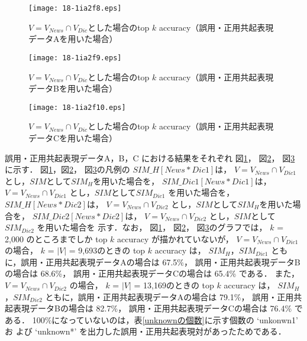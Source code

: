 \documentclass[japanese]{jnlp_1.4}
\begin{document}
\begin{figure}[t]
\begin{center}
\texttt{[image: 18-1ia2f8.eps]}
\end{center}
\caption{$V=V_{News}\cap V_{Dic}$とした場合のtop $k$ accuracy（誤用・正用共起表現データAを用いた場合）}
\label{類似度のみ共通topK-A}
\end{figure}
\begin{figure}[t]
\begin{center}
\texttt{[image: 18-1ia2f9.eps]}
\end{center}
\caption{$V=V_{News}\cap V_{Dic}$とした場合のtop $k$ accuracy（誤用・正用共起表現データBを用いた場合）}
\label{類似度のみ共通topK-B}
\end{figure}

\begin{figure}[t]
\begin{center}
\texttt{[image: 18-1ia2f10.eps]}
\end{center}
\caption{$V=V_{News}\cap V_{Dic}$とした場合のtop $k$ accuracy（誤用・正用共起表現データCを用いた場合）}
\label{類似度のみ共通topK-C}
\end{figure}

誤用・正用共起表現データA，B，C における結果をそれぞれ
図\ref{類似度のみ共通topK-A}，
図\ref{類似度のみ共通topK-B}，
図\ref{類似度のみ共通topK-C}に示す．
図\ref{類似度のみ共通topK-A}，図\ref{類似度のみ共通topK-B}，
図\ref{類似度のみ共通topK-C}の凡例の
$SIM\_H[News*Dic1]$は，
$V = V_{News} \cap V_{Dic1}$ とし，$SIM$として$SIM_{H}$を用いた場合を，
$SIM\_Dic1[News*Dic1]$は，
$V = V_{News} \cap V_{Dic1}$ とし，$SIM$として$SIM_{Dic1}$ を用いた場合を，
$SIM\_H[News*Dic2]$は，
$V = V_{News} \cap V_{Dic2}$ とし，$SIM$として$SIM_{H}$を用いた場合を，
$SIM\_Dic2[News*Dic2]$は，
$V = V_{News} \cap V_{Dic2}$ とし，$SIM$として$SIM_{Dic2}$ を用いた場合を
示す．なお，
図\ref{類似度のみ共通topK-A}，
図\ref{類似度のみ共通topK-B}，
図\ref{類似度のみ共通topK-C}のグラフでは，
$k$ = 2,000 のところまでしか top $k$ accuracy が描かれていないが，
$V = V_{News} \cap V_{Dic1}$ の場合，
$k$ = $|V|$ = 9,693のときの top $k$ accuracy は，
$SIM_{H}$，$SIM_{Dic1}$ ともに，誤用・正用共起表現データAの場合は 67.5\%，
誤用・正用共起表現データBの場合は 68.6\%，
誤用・正用共起表現データCの場合は 65.4\%
である．
また，
$V = V_{News} \cap V_{Dic2}$ の場合，
$k$ = $|V|$ = 13,169のときの top $k$ accuracy
は，
$SIM_{H}$，$SIM_{Dic2}$ ともに，誤用・正用共起表現データAの場合は 79.1\%，
誤用・正用共起表現データBの場合は 82.7\%，
誤用・正用共起表現データCの場合は 76.4\% である．
100\%になっていないのは，表\ref{unknownの個数}に示す個数の `unkonwn1' お
よび `unknown*' を出力した誤用・正用共起表現対があったためである．
\end{document}
